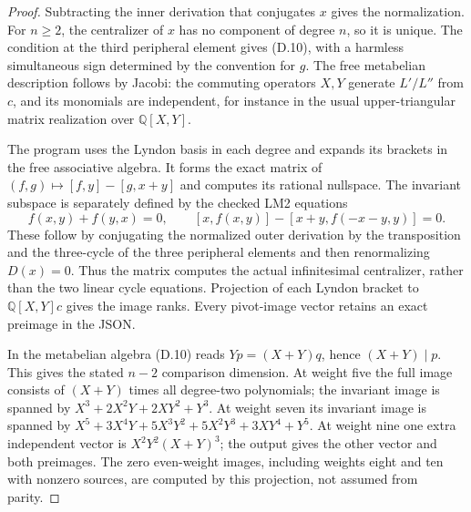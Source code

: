 \begin{proof}
Subtracting the inner derivation that conjugates $x$ gives the normalization. For $n\geq2$, the centralizer of $x$ has no component of degree $n$, so it is unique. The condition at the third peripheral element gives (D.10), with a harmless simultaneous sign determined by the convention for $g$. The free metabelian description follows by Jacobi: the commuting operators $X,Y$ generate $L'/L''$ from $c$, and its monomials are independent, for instance in the usual upper-triangular matrix realization over $\mathbb Q[X,Y]$.

The program uses the Lyndon basis in each degree and expands its brackets in the free associative algebra. It forms the exact matrix of $(f,g)\mapsto[f,y]-[g,x+y]$ and computes its rational nullspace. The invariant subspace is separately defined by the checked LM2 equations
\[
 f(x,y)+f(y,x)=0,\qquad
 [x,f(x,y)]-[x+y,f(-x-y,y)]=0.                             \tag{D.12}
\]
These follow by conjugating the normalized outer derivation by the transposition and the three-cycle of the three peripheral elements and then renormalizing $D(x)=0$. Thus the matrix computes the actual infinitesimal centralizer, rather than the two linear cycle equations. Projection of each Lyndon bracket to $\mathbb Q[X,Y]c$ gives the image ranks. Every pivot-image vector retains an exact preimage in the JSON.

In the metabelian algebra (D.10) reads $Yp=(X+Y)q$, hence $(X+Y)\mid p$. This gives the stated $n-2$ comparison dimension. At weight five the full image consists of $(X+Y)$ times all degree-two polynomials; the invariant image is spanned by
$X^3+2X^2Y+2XY^2+Y^3$.
At weight seven its invariant image is spanned by
$X^5+3X^4Y+5X^3Y^2+5X^2Y^3+3XY^4+Y^5$.
At weight nine one extra independent vector is $X^2Y^2(X+Y)^3$; the output gives the other vector and both preimages. The zero even-weight images, including weights eight and ten with nonzero sources, are computed by this projection, not assumed from parity.
\end{proof}

